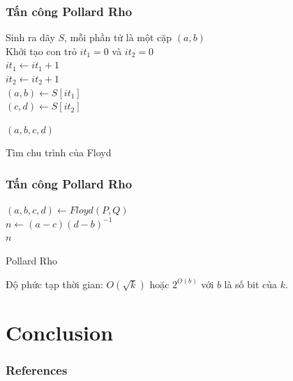 \documentclass [xcolor=svgnames, t] {beamer}
\theoremstyle{definition}
\begin{document}
\begin{frame}
    \frametitle{Tấn công Pollard Rho}

    \begin{algorithm}[H]
        \Begin
        {
            Sinh ra dãy $S$, mỗi phần tử là một cặp $(a,b)$ \\
            Khởi tạo con trỏ $it_1 = 0$ và $it_2 = 0$ \\
            {
                $it_1 \gets it_1 + 1$ \\
                $it_2 \gets it_2 + 1$ \\
                $(a,b) \gets S[it_1]$ \\
                $(c,d) \gets S[it_2]$ \\
            }

            \Return $(a,b,c,d)$
        }
        \caption{Tìm chu trình của Floyd}
    \end{algorithm}

\end{frame}
\begin{frame}
    \frametitle{Tấn công Pollard Rho}

    \begin{algorithm}[H]
        \Begin
        {
            $(a,b,c,d) \gets Floyd(P,Q)$ \\
            $n \gets (a-c)(d-b)^{-1}$ \\

            \Return $n$
        }
        \caption{Pollard Rho}
    \end{algorithm}
    Độ phức tạp thời gian: $O(\sqrt{k})$ hoặc $2^{O(b)}$ với $b$ là số bit của $k$.
\end{frame}
\section{Conclusion}


\begin{frame} [allowframebreaks]\frametitle{References}

    
    
\end{frame}
\end{document}
